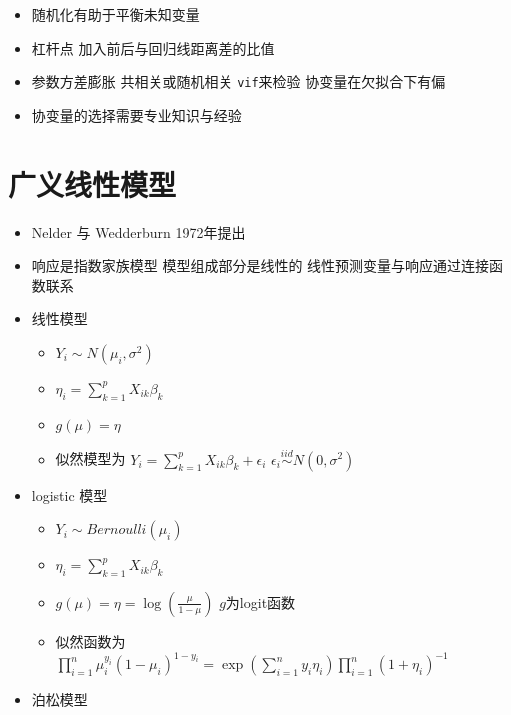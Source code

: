 \documentclass[
]{book}
\providecommand{\tightlist}{%
  \setlength{\itemsep}{0pt}\setlength{\parskip}{0pt}}
\begin{document}
\begin{itemize}
\tightlist
\item
  随机化有助于平衡未知变量
\item
  杠杆点 加入前后与回归线距离差的比值
\item
  参数方差膨胀 共相关或随机相关 \texttt{vif}来检验 协变量在欠拟合下有偏
\item
  协变量的选择需要专业知识与经验
\end{itemize}

\hypertarget{ux5e7fux4e49ux7ebfux6027ux6a21ux578b}{%
\section{广义线性模型}\label{ux5e7fux4e49ux7ebfux6027ux6a21ux578b}}

\begin{itemize}
\tightlist
\item
  Nelder 与 Wedderburn 1972年提出
\item
  响应是指数家族模型 模型组成部分是线性的 线性预测变量与响应通过连接函数联系
\item
  线性模型

  \begin{itemize}
  \tightlist
  \item
    \(Y_i \sim N(\mu_i, \sigma^2)\)
  \item
    \(\eta_i = \sum_{k=1}^p X_{ik} \beta_k\)
  \item
    \(g(\mu) = \eta\)
  \item
    似然模型为 \(Y_i = \sum_{k=1}^p X_{ik} \beta_k + \epsilon_{i}\) \(\epsilon_i \stackrel{iid}{\sim} N(0, \sigma^2)\)
  \end{itemize}
\item
  logistic 模型

  \begin{itemize}
  \tightlist
  \item
    \(Y_i \sim Bernoulli(\mu_i)\)
  \item
    \(\eta_i = \sum_{k=1}^p X_{ik} \beta_k\)
  \item
    \(g(\mu) = \eta = \log\left( \frac{\mu}{1 - \mu}\right)\) \(g\)为logit函数
  \item
    似然函数为 \(\prod_{i=1}^n \mu_i^{y_i} (1 - \mu_i)^{1-y_i} = \exp\left(\sum_{i=1}^n y_i \eta_i \right) \prod_{i=1}^n (1 + \eta_i)^{-1}\)
  \end{itemize}
\item
  泊松模型


\end{itemize}
\end{document}
